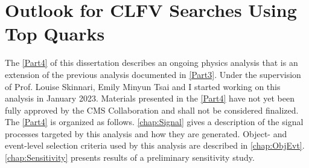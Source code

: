 \part{Outlook for CLFV Searches Using Top Quarks}
\label{Part4}
The \autoref{Part4} of this dissertation describes an ongoing physics analysis that is an extension of the previous analysis documented in \autoref{Part3}. Under the supervision of Prof. Louise Skinnari, Emily Minyun Tsai and I started working on this analysis in January 2023. Materials presented in the \autoref{Part4} have not yet been fully approved by the \ac{CMS} Collaboration and shall not be considered finalized. The \autoref{Part4} is organized as follows. \autoref{chap:Signal} gives a description of the signal processes targeted by this analysis and how they are generated. Object- and event-level selection criteria used by this analysis are described in \autoref{chap:ObjEvt}. \autoref{chap:Sensitivity} presents results of a preliminary sensitivity study.




